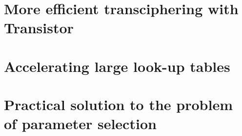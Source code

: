\documentclass[11pt, twoside, openright]{thesis}
\begin{document}
\chapter{More efficient transciphering with Transistor}



\chapter{Accelerating large look-up tables}
\label{chap:larger_lut}


\chapter{Practical solution to the problem of parameter selection}
\label{chap:parameters}
%
%





\end{document}
